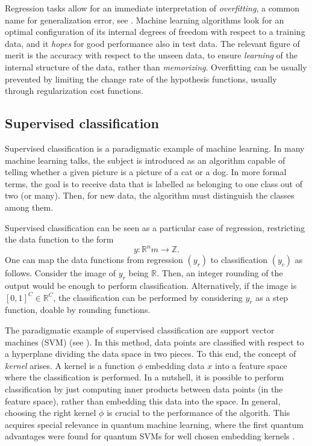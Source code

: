 \documentclass[]{report}
\begin{document}
Regression tasks allow for an immediate interpretation of \textit{overfitting}, a common name for generalization error, see . Machine learning algorithms look for an optimal configuration of its internal degrees of freedom with respect to a training data, and it \textit{hopes} for good performance also in test data. The relevant figure of merit is the accuracy with respect to the unseen data, to ensure \textit{learning} of the internal structure of the data, rather than \textit{memorizing}. Overfitting can be usually prevented by limiting the change rate of the hypothesis functions, usually through regularization cost functions. 


\subsection{Supervised classification}\label{sec.classification}

Supervised classification is a paradigmatic example of machine learning. In many machine learning talks, the subject is introduced as an algorithm capable of telling whether a given picture is a picture of a cat or a dog. In more formal terms, the goal is to receive data that is labelled as belonging to one class out of two (or many). Then, for new data, the algorithm must distinguish the classes among them. 

Supervised classification can be seen as a particular case of regression, restricting the data function to the form
\begin{equation}
y: \mathbb R^nm \rightarrow \mathbb Z. 
\end{equation}
One can map the data functions from regression $(y_r)$ to classification $(y_c)$ as follows. Consider the image of $y_r$ being $\mathbb R$. Then, an integer rounding of the output would be enough to perform classification. Alternatively, if the image is $[0, 1]^C \in \mathbb R^C$, the classification can be performed by considering $y_r$ as a step function, doable by rounding functions. 

The paradigmatic example of supervised classification are support vector machines (SVM) (see ). In this method, data points are classified with respect to a hyperplane dividing the data space in two pieces. To this end, the concept of \textit{kernel} arises. A kernel is a function $\phi$ embedding data $x$ into a feature space where the classification is performed. In a nutshell, it is possible to perform classification by just computing inner products between data points (in the feature space), rather than embedding this data into the space. In general, choosing the right kernel $\phi$ is crucial to the performance of the algorith. This acquires special relevance in quantum machine learning, where the first quantum advantages were found for quantum SVMs for well chosen embedding kernels \cite{liu2021rigorous}.
\end{document}

